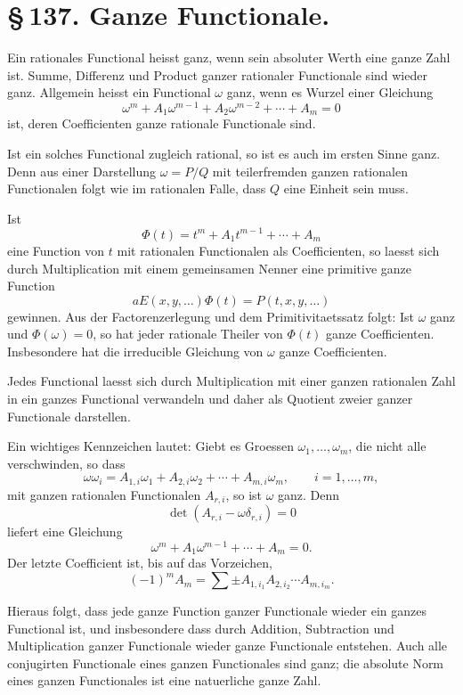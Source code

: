 \documentclass[11pt]{article}
\begin{document}
\section*{\S\,137. Ganze Functionale.}

Ein rationales Functional heisst ganz, wenn sein absoluter Werth eine
ganze Zahl ist. Summe, Differenz und Product ganzer rationaler
Functionale sind wieder ganz. Allgemein heisst ein Functional
\(\omega\) ganz, wenn es Wurzel einer Gleichung
\begin{equation}
\omega^m+A_1\omega^{m-1}+A_2\omega^{m-2}+\cdots+A_m=0
\tag{1}
\end{equation}
ist, deren Coefficienten ganze rationale Functionale sind.

Ist ein solches Functional zugleich rational, so ist es auch im
ersten Sinne ganz. Denn aus einer Darstellung \(\omega=P/Q\) mit
teilerfremden ganzen rationalen Functionalen folgt wie im rationalen
Falle, dass \(Q\) eine Einheit sein muss.

Ist
\[
\Phi(t)=t^m+A_1t^{m-1}+\cdots+A_m
\]
eine Function von \(t\) mit rationalen Functionalen als Coefficienten,
so laesst sich durch Multiplication mit einem gemeinsamen Nenner eine
primitive ganze Function
\[
aE(x,y,\ldots)\Phi(t)=P(t,x,y,\ldots)
\tag{2}
\]
gewinnen. Aus der Factorenzerlegung und dem Primitivitaetssatz folgt:
Ist \(\omega\) ganz und \(\Phi(\omega)=0\), so hat jeder rationale
Theiler von \(\Phi(t)\) ganze Coefficienten. Insbesondere hat die
irreducible Gleichung von \(\omega\) ganze Coefficienten.

Jedes Functional laesst sich durch Multiplication mit einer ganzen
rationalen Zahl in ein ganzes Functional verwandeln und daher als
Quotient zweier ganzer Functionale darstellen.

Ein wichtiges Kennzeichen lautet: Giebt es Groessen
\(\omega_1,\ldots,\omega_m\), die nicht alle verschwinden, so dass
\begin{equation}
\omega\omega_i=A_{1,i}\omega_1+A_{2,i}\omega_2+\cdots+A_{m,i}\omega_m,
\qquad i=1,\ldots,m,
\tag{5}
\end{equation}
mit ganzen rationalen Functionalen \(A_{r,i}\), so ist \(\omega\)
ganz. Denn
\[
\det(A_{r,i}-\omega\delta_{r,i})=0
\tag{6}
\]
liefert eine Gleichung
\[
\omega^m+A_1\omega^{m-1}+\cdots+A_m=0.
\tag{7}
\]
Der letzte Coefficient ist, bis auf das Vorzeichen,
\[
(-1)^mA_m=\sum \pm A_{1,i_1}A_{2,i_2}\cdots A_{m,i_m}.
\tag{8}
\]

Hieraus folgt, dass jede ganze Function ganzer Functionale wieder ein
ganzes Functional ist, und insbesondere dass durch Addition,
Subtraction und Multiplication ganzer Functionale wieder ganze
Functionale entstehen. Auch alle conjugirten Functionale eines ganzen
Functionales sind ganz; die absolute Norm eines ganzen Functionales
ist eine natuerliche ganze Zahl.
\end{document}
